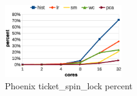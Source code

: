 \begin{figure}[!h!t]  
    \centering
    \includegraphics[width=0.45\textwidth]{eps/phoenix_spinlock.eps}
    \caption{Phoenix ticket\_spin\_lock percent}
    \label{fig:phoenix:spinlock}
\end{figure}





